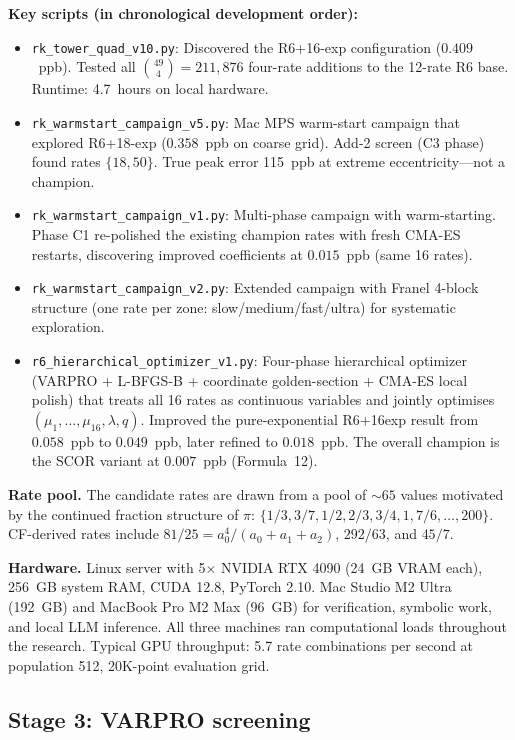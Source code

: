 \documentclass[12pt]{article}
\begin{document}
\medskip\noindent\textbf{Key scripts (in chronological development order):}
\begin{itemize}
\item \texttt{rk\_tower\_quad\_v10.py}: Discovered the R6+16-exp configuration ($0.409$~ppb). Tested all $\binom{49}{4} = 211{,}876$ four-rate additions to the 12-rate R6 base. Runtime: 4.7~hours on local hardware.
\item \texttt{rk\_warmstart\_campaign\_v5.py}: Mac MPS warm-start campaign that explored R6+18-exp ($0.358$~ppb on coarse grid). Add-2 screen (C3 phase) found rates $\{18, 50\}$. True peak error 115~ppb at extreme eccentricity---not a champion.
\item \texttt{rk\_warmstart\_campaign\_v1.py}: Multi-phase campaign with warm-starting. Phase C1 re-polished the existing champion rates with fresh CMA-ES restarts, discovering improved coefficients at $0.015$~ppb (same 16 rates).
\item \texttt{rk\_warmstart\_campaign\_v2.py}: Extended campaign with Franel 4-block structure (one rate per zone: slow/medium/fast/ultra) for systematic exploration.
\item \texttt{r6\_hierarchical\_optimizer\_v1.py}: Four-phase hierarchical optimizer (VARPRO + L-BFGS-B + coordinate golden-section + CMA-ES local polish) that treats all 16 rates as continuous variables and jointly optimises $(\mu_1,\ldots,\mu_{16},\lambda,q)$. Improved the pure-exponential R6+16exp result from $0.058$~ppb to $0.049$~ppb, later refined to $0.018$~ppb. The overall champion is the SCOR variant at $0.007$~ppb (Formula~12).
\end{itemize}

\medskip\noindent\textbf{Rate pool.} The candidate rates are drawn from a pool of ${\sim}65$ values motivated by the continued fraction structure of $\pi$: $\{1/3, 3/7, 1/2, 2/3, 3/4, 1, 7/6, \ldots, 200\}$. CF-derived rates include $81/25 = a_0^4/(a_0{+}a_1{+}a_2)$, $292/63$, and $45/7$.

\medskip\noindent\textbf{Hardware.} Linux server with 5$\times$ NVIDIA RTX 4090 (24~GB VRAM each), 256~GB system RAM, CUDA 12.8, PyTorch 2.10. Mac Studio M2 Ultra (192~GB) and MacBook Pro M2 Max (96~GB) for verification, symbolic work, and local LLM inference. All three machines ran computational loads throughout the research. Typical GPU throughput: 5.7 rate combinations per second at population 512, 20K-point evaluation grid.

\subsection{Stage 3: VARPRO screening}
\end{document}
